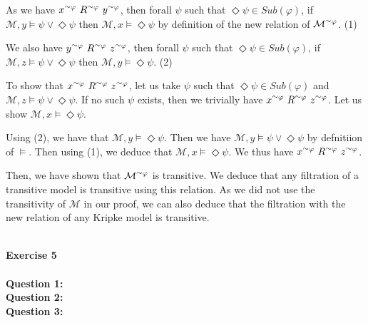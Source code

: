 \documentclass[10pt]{article}
\def\exercise#1{\ \vspace{1cm}\\\Large\textbf{Exercise #1}\normalsize\\}
\def\question#1{\ \vspace{1cm}\\\textbf{Question #1:}\quad}
\def\tilde{\raise.17ex\hbox{$\scriptstyle\sim$}}
\def\M{\mathcal{M}}
\def\tphi{^{\tilde\varphi}}
\begin{document}
As we have $x\tphi\ R\tphi\ y\tphi$, then forall $\psi$ such that $\Diamond\psi\in\mathit{Sub}(\varphi)$, if $\M,y\models\psi\vee\Diamond\psi$ then $\M,x\models\Diamond\psi$ by definition of the new relation of $\M\tphi$. (1)

We also have $y\tphi\ R\tphi\ z\tphi$, then forall $\psi$ such that $\Diamond\psi\in\mathit{Sub}(\varphi)$, if $\M,z\models\psi\vee\Diamond\psi$ then $\M,y\models\Diamond\psi$. (2)

To show that $x\tphi\ R\tphi\ z\tphi$, let us take $\psi$ such that $\Diamond\psi\in\mathit{Sub}(\varphi)$ and $\M,z\models\psi\vee\Diamond\psi$. If no such $\psi$ exists, then we trivially have $x\tphi\ R\tphi\ z\tphi$. Let us show $\M,x\models\Diamond\psi$.

Using (2), we have that $\M,y\models\Diamond\psi$. Then we have $\M,y\models\psi\vee\Diamond\psi$ by defnitiion of $\models$. Then using (1), we deduce that $\M,x\models\Diamond\psi$. We thus have $x\tphi\ R\tphi\ z\tphi$.

Then, we have shown that $\M\tphi$ is transitive. We deduce that any filtration of a transitive model is transitive using this relation. As we did not use the transitivity of $\M$ in our proof, we can also deduce that the filtration with the new relation of any Kripke model is transitive.

\exercise{5}
\question{1}
\question{2}
\question{3}
\end{document}
